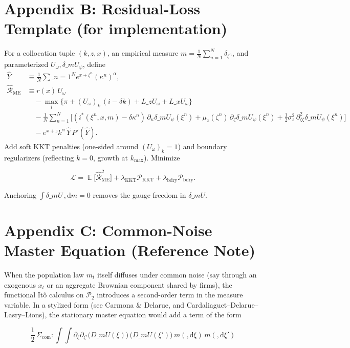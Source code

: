 \documentclass[11pt,letterpaper,oneside]{article}
\numberwithin{equation}{section}
\DeclareMathOperator{\E}{\mathbb{E}}
\newcommand{\1}{\mathbf{1}}
\newcommand{\diff}{,\mathrm{d}}
\newcommand{\Lz}{L\_z}
\newcommand{\Lx}{L\_x}
\newcommand{\dmU}{\delta\_m U}
\newcommand{\Dm}{D\_m}
\begin{document}
\section{Appendix B: Residual-Loss Template (for implementation)}\label{app:loss}

For a collocation tuple $(k,z,x)$, an empirical measure $m=\tfrac1N\sum_{n=1}^N \delta_{\xi^n}$, and parameterized $U_\omega,\dmU_\psi$, define
\begin{align*}
\widehat{Y} &\equiv \frac{1}{N}\sum\_{n=1}^N e^{x+\zeta^n}(\kappa^n)^\alpha,\\
\widehat{\mathcal{R}}_{\mathrm{ME}} &\equiv r(x)\,U_\omega\\
  &\quad - \max_{i}\Big\{ \pi + (U_{\omega})_k\,(i-\delta k) + \Lz U_{\omega} + \Lx U_{\omega} \Big\} \\
  &\quad - \frac{1}{N}\sum_{n=1}^N \Big[ (i^*(\xi^n,x,m)-\delta\kappa^n)\,\partial_{\kappa}\dmU_{\psi}(\xi^n)
    + \mu_z(\zeta^n)\,\partial_{\zeta}\dmU_{\psi}(\xi^n)
    + \tfrac12 \sigma_z^2\,\partial^2_{\zeta\zeta}\dmU_{\psi}(\xi^n) \Big] \\
  &\quad - e^{x+z}k^{\alpha}\,\widehat{Y}\,P'(\widehat{Y}).
  \end{align*}
  Add soft KKT penalties (one-sided around $(U_\omega)_k=1$) and boundary regularizers (reflecting $k=0$, growth at $k_{\max}$). Minimize

$$
\mathcal{L}=\E\big[\widehat{\mathcal{R}}_{\mathrm{ME}}^2\big]+\lambda_{\mathrm{KKT}}\mathcal{P}_{\mathrm{KKT}}
+\lambda_{\mathrm{bdry}}\mathcal{P}_{\mathrm{bdry}}.
$$

Anchoring $\int \dmU\,\diff m=0$ removes the gauge freedom in $\dmU$.

\section{Appendix C: Common-Noise Master Equation (Reference Note)}\label{app:common-noise}

When the population law $m_t$ itself diffuses under common noise (say through an exogenous $x_t$ or an aggregate Brownian component shared by firms), the functional Itô calculus on $\mathcal P_2$ introduces a second-order term in the measure variable. In a stylized form (see Carmona \& Delarue, and Cardaliaguet--Delarue--Lasry--Lions), the stationary master equation would add a term of the form

$$
\frac{1}{2}\,\Sigma_{\mathrm{com}}:\!\int\!\!\int
\partial_{\xi}\partial_{\xi'} \big(\Dm U(\xi)\big)\,\big(\Dm U(\xi')\big)
\, m(\diff \xi)\, m(\diff \xi')
$$
\end{document}
